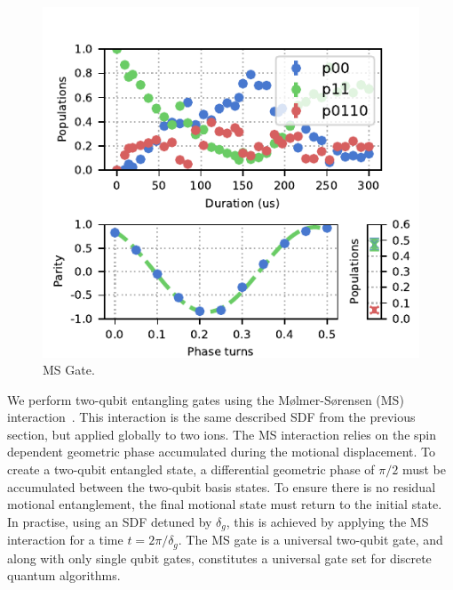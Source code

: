     \begin{figure}
        \begin{center}
        \noindent\includegraphics[width=\linewidth]{
            figures/pdf_figure/ms_gate.pdf
            }
        \end{center}
        \caption{
            MS Gate.
            }
        \label{fig:ms_gate}
    \end{figure}

    We perform two-qubit entangling gates using the Mølmer-Sørensen (MS)
    interaction~\cite{}. This interaction is the same described SDF from the
    previous section, but applied globally to two ions. The MS interaction
    relies on the spin dependent geometric phase accumulated during the motional
    displacement. To create a two-qubit entangled state, a differential
    geometric phase of $\pi/2$ must be accumulated between the two-qubit basis
    states. To ensure there is no residual motional entanglement, the final
    motional state must return to the initial state. In practise, using an SDF
    detuned by $\delta_g$, this is achieved by applying the MS interaction for a
    time $t = 2\pi/\delta_g$. The MS gate is a universal two-qubit gate, and
    along with only single qubit gates, constitutes a universal gate set for
    discrete quantum algorithms.\\  

